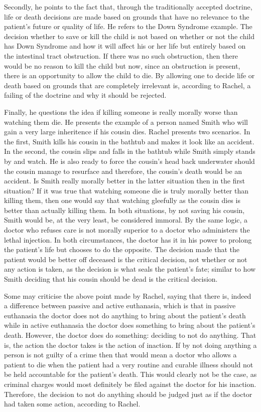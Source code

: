 \documentclass{article}
\begin{document}
Secondly, he points to the fact that, through the traditionally accepted doctrine,
life or death decisions are made based on grounds that have no relevance to the patient's
future or quality of life. He refers to the Down Syndrome example. The decision
whether to save or kill the child is not based on whether or not the child has
Down Syndrome and how it will affect his or her life but entirely based on
the intestinal tract obstruction. If there was no such obstruction, then there
would be no reason to kill the child but now, since an obstruction is present,
there is an opportunity to allow the child to die. By allowing one to decide life
or death based on grounds that are completely irrelevant is, according to Rachel,
a failing of the doctrine and why it should be rejected.

Finally, he questions the idea if killing someone is really morally worse than watching
them die. He presents the example of a person named Smith who will gain a very large
inheritence if his cousin dies. Rachel presents two scenarios. In the first, Smith
kills his cousin in the bathtub and makes it look like an accident. In the second,
the cousin slips and falls in the bathtub while Smith simply stands by and watch. He
is also ready to force the cousin's head back underwater should the cousin manage to
resurface and therefore, the cousin's death would be an accident. Is Smith really
morally better in the latter situation then in the first situation? If it was true
that watching someone die is truly morally better than killing them, then one would
say that watching gleefully as the cousin dies is better than actually killing them.
In both situations, by not saving his cousin, Smith would be, at the very least, be
considered immoral. By the same logic, a doctor who refuses care is not morally
superior to a doctor who administers the lethal injection. In both circumstances, 
the doctor has it in his power to prolong the patient's life but chooses to do the
opposite. The decision made that the patient would be better off deceased is the
critical decision, not whether or not any action is taken, as the decision is what
seals the patient's fate; similar to how Smith deciding that his cousin should be
dead is the critical decision.

Some may criticise the above point made by Rachel, saying that there is, indeed a
difference between passive and active euthanasia, which is that in passive euthanasia
the doctor does not do anything to bring about the patient's death while in active
euthanasia the doctor does something to bring about the patient's death. However, the
doctor does do something: deciding to not do anything. That is, the action the doctor
takes is the action of inaction. If by not doing anything a person is not guilty of
a crime then that would mean a doctor who allows a patient to die when the patient
had a very routine and curable illness should not be held accountable for the patient's
death. This would clearly not be the case, as criminal charges would most definitely
be filed against the doctor for his inaction. Therefore, the decision to not do anything
should be judged just as if the doctor had taken some action, according to Rachel.
\end{document}
